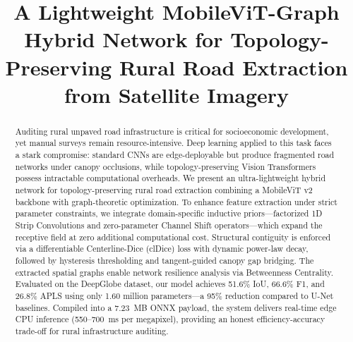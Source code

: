 \documentclass[conference]{IEEEtran}
\begin{document}
\title{A Lightweight MobileViT-Graph Hybrid Network for Topology-Preserving Rural Road Extraction from Satellite Imagery}

\author{
}

\maketitle

\begin{abstract}
Auditing rural unpaved road infrastructure is critical for socioeconomic development, yet manual surveys remain resource-intensive. Deep learning applied to this task faces a stark compromise: standard CNNs are edge-deployable but produce fragmented road networks under canopy occlusions, while topology-preserving Vision Transformers possess intractable computational overheads. We present an ultra-lightweight hybrid network for topology-preserving rural road extraction combining a MobileViT v2 backbone with graph-theoretic optimization. To enhance feature extraction under strict parameter constraints, we integrate domain-specific inductive priors—factorized 1D Strip Convolutions and zero-parameter Channel Shift operators—which expand the receptive field at zero additional computational cost. Structural contiguity is enforced via a differentiable Centerline-Dice (clDice) loss with dynamic power-law decay, followed by hysteresis thresholding and tangent-guided canopy gap bridging. The extracted spatial graphs enable network resilience analysis via Betweenness Centrality. Evaluated on the DeepGlobe dataset, our model achieves 51.6\% IoU, 66.6\% F1, and 26.8\% APLS using only 1.60 million parameters—a 95\% reduction compared to U-Net baselines. Compiled into a 7.23~MB ONNX payload, the system delivers real-time edge CPU inference (550--700~ms per megapixel), providing an honest efficiency-accuracy trade-off for rural infrastructure auditing.
\end{abstract}
\end{document}
